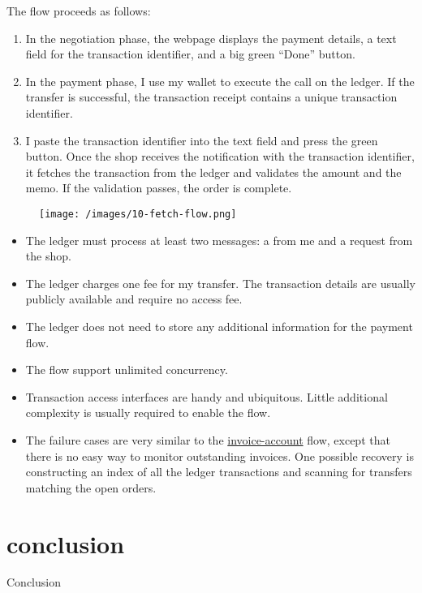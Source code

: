 \documentclass{article}
\begin{document}
The flow proceeds as follows:
\begin{enumerate}
  \item In the negotiation phase, the webpage displays the payment details, a text field for the transaction identifier, and a big green ``Done'' button.
  \item
    In the payment phase, I use my wallet to execute the  call on the ledger.
    If the transfer is successful, the transaction receipt contains a unique transaction identifier.
  \item
    I paste the transaction identifier into the text field and press the green button.
    Once the shop receives the notification with the transaction identifier, it fetches the transaction from the ledger and validates the amount and the memo.
    If the validation passes, the order is complete.
\end{enumerate}

\begin{figure}[grayscale-diagram]
\texttt{[image: /images/10-fetch-flow.png]}
\end{figure}

\begin{itemize}
  \item The ledger must process at least two messages: a  from me and a  request from the shop.
  \item
    The ledger charges one fee for my transfer.
    The transaction details are usually publicly available and require no access fee.
  \item The ledger does not need to store any additional information for the payment flow.
  \item The flow support unlimited concurrency.
  \item
    Transaction access interfaces are handy and ubiquitous.
    Little additional complexity is usually required to enable the flow.
  \item
    The failure cases are very similar to the \href{#invoice-account}{invoice-account} flow, except that there is no easy way to monitor outstanding invoices.
    One possible recovery is constructing an index of all the ledger transactions and scanning for transfers matching the open orders.
\end{itemize}

\section{conclusion}{Conclusion}
\end{document}
